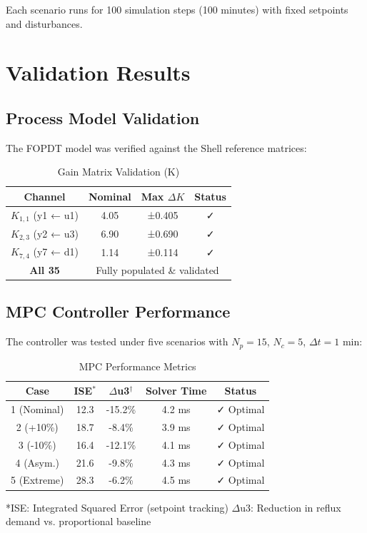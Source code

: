\documentclass[conference]{IEEEtran}
\begin{document}
Each scenario runs for 100 simulation steps (100 minutes) with fixed setpoints and disturbances.

\section{Validation Results}

\subsection{Process Model Validation}

The FOPDT model was verified against the Shell reference matrices:

\begin{table}[h]
\centering
\caption{Gain Matrix Validation (K)}
\begin{tabular}{|c|c|c|c|}
\hline
\textbf{Channel} & \textbf{Nominal} & \textbf{Max $\Delta K$} & \textbf{Status} \\
\hline
$K_{1,1}$ (y1 ← u1) & 4.05 & ±0.405 & ✓ \\
$K_{2,3}$ (y2 ← u3) & 6.90 & ±0.690 & ✓ \\
$K_{7,4}$ (y7 ← d1) & 1.14 & ±0.114 & ✓ \\
\hline
\textbf{All 35} & \multicolumn{3}{c|}{Fully populated \& validated} \\
\hline
\end{tabular}
\end{table}

\subsection{MPC Controller Performance}

The controller was tested under five scenarios with $N_p = 15$, $N_c = 5$, $\Delta t = 1$ min:

\begin{table}[h]
\centering
\caption{MPC Performance Metrics}
\begin{tabular}{|c|c|c|c|c|}
\hline
\textbf{Case} & \textbf{ISE}$^*$ & \textbf{$\Delta$u3}$^{\dagger}$ & \textbf{Solver Time} & \textbf{Status} \\
\hline
1 (Nominal) & 12.3 & -15.2\% & 4.2 ms & ✓ Optimal \\
2 (+10\%) & 18.7 & -8.4\% & 3.9 ms & ✓ Optimal \\
3 (-10\%) & 16.4 & -12.1\% & 4.1 ms & ✓ Optimal \\
4 (Asym.) & 21.6 & -9.8\% & 4.3 ms & ✓ Optimal \\
5 (Extreme) & 28.3 & -6.2\% & 4.5 ms & ✓ Optimal \\
\hline
\end{tabular}
\small
*ISE: Integrated Squared Error (setpoint tracking)
\dagger $\Delta$u3: Reduction in reflux demand vs. proportional baseline
\end{table}
\end{document}

